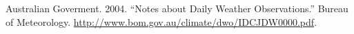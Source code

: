 \documentclass[
]{article}
\newenvironment{Shaded}{\begin{snugshade}}{\end{snugshade}}
\newcommand{\ControlFlowTok}[1]{\textcolor[rgb]{0.13,0.29,0.53}{\textbf{#1}}}
\newcommand{\FunctionTok}[1]{\textcolor[rgb]{0.00,0.00,0.00}{#1}}
\newcommand{\NormalTok}[1]{#1}
\newcommand{\SpecialCharTok}[1]{\textcolor[rgb]{0.00,0.00,0.00}{#1}}
\newlength{\cslhangindent}
\newlength{\cslentryspacingunit} %
\newenvironment{CSLReferences}[2] %
 {%
  \setlength{\parindent}{0pt}
  \ifodd #1
  \let\oldpar\par
  \def\par{\hangindent=\cslhangindent\oldpar}
  \fi
  \setlength{\parskip}{#2\cslentryspacingunit}
 }%
 {}
\begin{document}
\begin{Shaded}
\end{Shaded}

\hypertarget{refs}{}
\begin{CSLReferences}{1}{0}
\leavevmode{}%
Australian Goverment. 2004. {``Notes about Daily Weather
Observations.''} Bureau of Meteorology.
\url{http://www.bom.gov.au/climate/dwo/IDCJDW0000.pdf}.

\end{CSLReferences}
\end{document}
